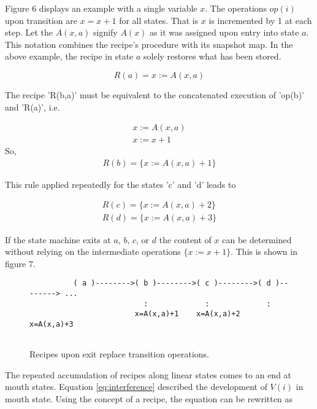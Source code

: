 \documentclass[12pt,a4paper]{scrartcl}
\begin{document}
Figure 6 displays an example with a single variable $x$. The operations $op(i)$
upon transition are $x=x+1$ for all states. That is $x$ is incremented by 1 at
each step. Let the $A(x,a)$ signify $A(x)$ as it was assigned upon entry into
state $a$. This notation combines the recipe's procedure with its snapshot map.
In the above example, the recipe in state $a$ solely restores what has been
stored.

\begin{equation}
\label{eq:}
               R(a) = { x := A(x,a) }                                     
\end{equation}

The recipe 'R(b,a)' must be equivalent to the concatenated execution of 'op(b)'
and 'R(a)', i.e.

\begin{eqnarray}
    { x  :=  A(x,a) } \\
    { x  :=  x + 1 }
\end{eqnarray}
So, 
\begin{eqnarray}
    R(b)  =  \{ x := A(x,a) + 1 \}                                 
\end{eqnarray}

This rule applied repeatedly for the states 'c' and 'd' leads to

\begin{eqnarray}
    R(c)  =  \{ x := A(x,a) + 2 \} \\
    R(d)  =  \{ x := A(x,a) + 3 \}                                 
\end{eqnarray}

If the state machine exits at $a$, $b$, $c$, or $d$ the content of $x$ can be
determined without relying on the intermediate operations $\{ x:=x+1 \}$. This
is shown in figure 7.
 
\begin{figure}[htbp] \leavevmode
\begin{verbatim}
          ( a )-------->( b )-------->( c )-------->( d )--------> ...
                          :             :             :
                        x=A(x,a)+1    x=A(x,a)+2    x=A(x,a)+3


\end{verbatim}
\caption{Recipes upon exit replace transition operations.}
\end{figure}

The repeated accumulation of recipes along linear states comes to an end at
mouth states.  Equation \eqref{eq:interference} described the development of
$V(i)$ in mouth state. Using the concept of a recipe, the equation can be
rewritten as
\end{document}
